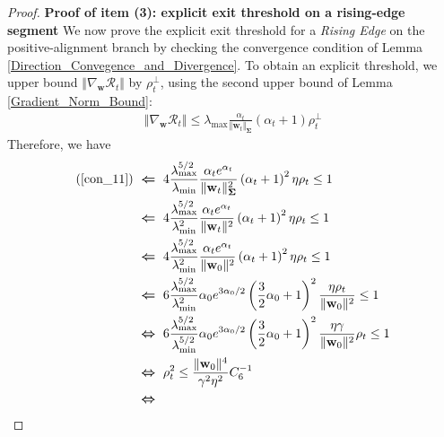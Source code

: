 \documentclass[pdflatex,sn-basic]{sn-jnl}%
\theoremstyle{thmstyleone}%
\begin{document}
\begin{appendices}
\begin{proof}
  \noindent \textbf{Proof of item (3): explicit exit threshold on a rising-edge segment} 
  We now prove the explicit exit threshold for a \textit{Rising Edge} on the positive-alignment branch by checking the
  convergence condition of Lemma \ref{Direction_Convegence_and_Divergence}. 
  To obtain an explicit threshold, we upper bound $\Vert \nabla_{\mathbf{w}} \mathcal{R}_t \Vert$ by $\rho_t^\perp$, 
  using the second upper bound of Lemma \ref{Gradient_Norm_Bound}: 
  \begin{equation*}
  \begin{aligned}
    \left\Vert 
    \nabla_{\mathbf{w}} \mathcal{R}_t
    \right\Vert
    \le 
    \lambda_{\max}
    \frac{\alpha_t}{\Vert \mathbf{w}_t \Vert_{\mathbf{\Sigma}}}
    \left( \alpha_t + 1 \right)
    \rho_t^{\perp}
  \end{aligned}
  \end{equation*}
  Therefore, we have 
  \begin{equation*}
  \begin{aligned}
    (\ref{con_11})
    & \ \boldsymbol{\Leftarrow} \ 
    4
    \frac{\lambda_{\max}^{5/2}}{\lambda_{\min} }
    \frac{\alpha_t e^{\alpha_t} }{\Vert \mathbf{w}_t \Vert_{\mathbf{\Sigma}}^2}
    \left( \alpha_t + 1 \right)^2
    \eta {\rho}_{t}
    \le 
    1
    \\ & \ \boldsymbol{\Leftarrow} \ 
    4
    \frac{\lambda_{\max}^{5/2}}{\lambda_{\min}^2 }
    \frac{\alpha_t e^{\alpha_t} }{\Vert \mathbf{w}_t \Vert^2}
    \left( \alpha_t + 1 \right)^2
    \eta {\rho}_{t}
    \le 
    1
    \\ & \ \boldsymbol{\Leftarrow} \ 
    4
    \frac{\lambda_{\max}^{5/2}}{\lambda_{\min}^2 }
    \frac{\alpha_t e^{\alpha_t} }{\Vert \mathbf{w}_0 \Vert^2}
    \left( \alpha_t + 1 \right)^2
    \eta {\rho}_{t}
    \le 
    1
    \\ & \ \boldsymbol{\Leftarrow} \ 
    6
    \frac{\lambda_{\max}^{5/2}}{\lambda_{\min}^2 }
    \alpha_0 e^{3 \alpha_0 / 2}\left( \frac{3}{2} \alpha_0 + 1 \right)^2
    \frac{\eta {\rho}_{t}}{\Vert \mathbf{w}_0 \Vert^2}
    \le 
    1
    \\ & \ \boldsymbol{\Leftrightarrow} \ 
    6
    \frac{\lambda_{\max}^{5/2}}{\lambda_{\min}^{5/2} }
    \alpha_0 e^{3 \alpha_0 / 2}\left( \frac{3}{2} \alpha_0 + 1 \right)^2
    \frac{\eta \gamma}{\Vert \mathbf{w}_0 \Vert^2} {\rho}_{t}
    \le 
    1
    \\ & \ \boldsymbol{\Leftrightarrow} \ 
    {\rho}_{t}^2
    \le 
    \frac{\Vert \mathbf{w}_0 \Vert^4}{\gamma^2 \eta^2}
    C_6^{-1}
    \\ & \ \boldsymbol{\Leftrightarrow} \ 

\end{aligned}
\end{equation*}
\end{proof}
\end{appendices}
\end{document}
